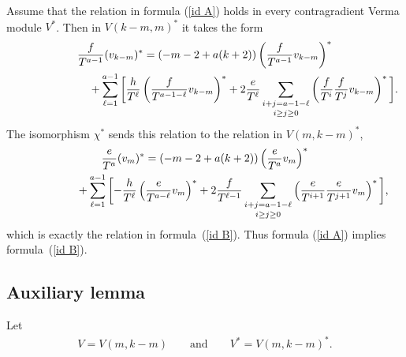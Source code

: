 \documentclass[11pt]{article}
\numberwithin{equation}{section}
\begin{document}
Assume that the relation in formula (\ref{id A}) holds in every contragradient Verma module $V^*$. Then in $V(k-m, m)^*$ it takes the form
\begin{gather*}
\frac{f}{T^{a-1}} (v_{k-m})^* = (-m-2+ a(k+2))\left(\frac{f}{T^{a-1}}v_{k-m}\right)^* \nonumber \\
\hphantom{\frac{f}{T^{a-1}} (v_{k-m})^* =}{} + \sum_{\ell=1}^{a-1} \bigg[\frac{h}{T^\ell}\left(\frac{f}{T^{a-1-\ell}}v_{k-m}\right)^* + 2 \frac{e}{T^\ell}\mathop{\sum_{i+j=a-1-\ell}}_{i\geq j\geq 0}
\left(\frac{f}{T^i}\frac{f}{T^j}v_{k-m}\right)^*\bigg].%
\end{gather*}
The isomorphism $\chi^*$ sends this relation to the relation in $V(m,k-m)^*$,
\begin{gather*}
\frac{e}{T^{a}} (v_{m})^* = (-m-2+ a(k+2))\left(\frac{e}{T^{a}}v_{m}\right)^* \nonumber\\
\hphantom{\frac{e}{T^{a}} (v_{m})^* =}{} + \sum_{\ell=1}^{a-1} \bigg[{-}\frac{h}{T^\ell}\left(\frac{e}{T^{a-\ell}}v_{m}\right)^* + 2 \frac{f}{T^{\ell-1}}\mathop{\sum_{i+j=a-1-\ell}}_{i\geq j\geq 0}
\left(\frac{e}{T^{i+1}}\frac{e}{T^{j+1}}v_{m}\right)^*\bigg],%
\end{gather*}
which is exactly the relation in formula~(\ref{id B}). Thus formula (\ref{id A}) implies formula~(\ref{id B}).

\subsection{Auxiliary lemma}\label{subsec aux lemma}
Let
\begin{gather*}
V=V(m,k-m) \qquad \text{and} \qquad V^* = V(m,k-m)^*.
\end{gather*}
\end{document}
